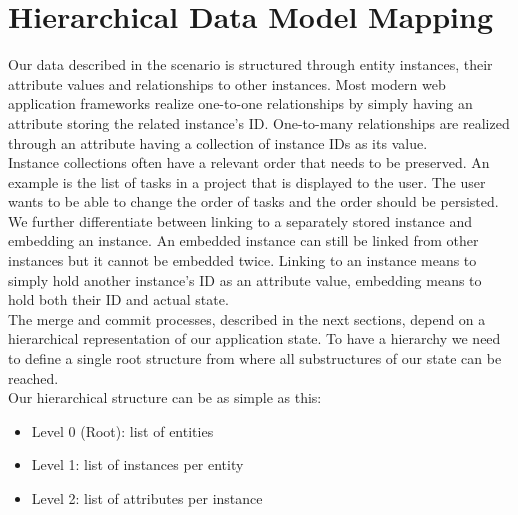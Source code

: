 
\section{Hierarchical Data Model Mapping}
\label{sec:histo.hierarchy}
Our data described in the scenario is structured through entity instances, their attribute values and relationships to other instances.
Most modern web application frameworks realize one-to-one relationships by simply having an attribute storing the related instance's ID.
One-to-many relationships are realized through an attribute having a collection of 
instance IDs as its value.\\
Instance collections often have a relevant order that needs to be preserved.
An example is the list of tasks in a project that is displayed to the user.
The user wants to be able to change the order of tasks and the order should be persisted.\\
We further differentiate between linking to a separately stored instance and  embedding an instance.
An embedded instance can still be linked from other instances but it cannot be embedded twice.
Linking to an instance means to simply hold another instance's ID as an attribute value, embedding means to hold both their ID and actual state.\\

The merge and commit processes, described in the next sections, depend on a hierarchical representation of our application state.
To have a hierarchy we need to define a single root structure from where all substructures of our state can be reached.\\
Our hierarchical structure can be as simple as this:

\begin{itemize}
\item Level 0 (Root): list of entities
\item Level 1: list of instances per entity
\item Level 2: list of attributes per instance
\end{itemize}

